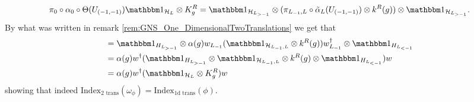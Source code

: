 \documentclass[11pt,a4paper,twoside]{article}
\numberwithin{equation}{section}
\begin{document}
\begin{equation}
	\pi_0\circ\alpha_0\circ\Theta(U_{(-1,-1)})\id_{\HH_L}\otimes K_g^R=\id_{\HH_{L_{>-1}}}\otimes(\pi_{L_{-1},L}\circ\tilde\alpha_L(U_{(-1,-1)})\otimes k^R(g))\otimes\id_{\HH_{L_{>-1}}}.
\end{equation}
By what was written in remark \ref{rem:GNS_One_DimensionalTwoTranslations} we get that
\begin{align}
	&=\id_{H_{L_{>-1}}}\otimes\alpha(g) w_{L_{-1}}(\id_{\HH_{L_{-1},L}}\otimes k^R(g))w_{L_{-1}}^\dagger\otimes \id_{H_{L_{<-1}}}\\
	&=\alpha(g)w^\dagger (\id_{H_{L_{>-1}}}\otimes \id_{\HH_{L_{-1},L}}\otimes k^R(g)\otimes \id_{H_{L_{<-1}}}) w\\
	&=\alpha(g)w^\dagger (\id_{\HH_L}\otimes K^R_g) w
\end{align}
showing that indeed $\textrm{Index}_{\text{2 trans}}(\omega_\phi)=\textrm{Index}_{\text{1d trans}}(\phi)$.
\end{document}
